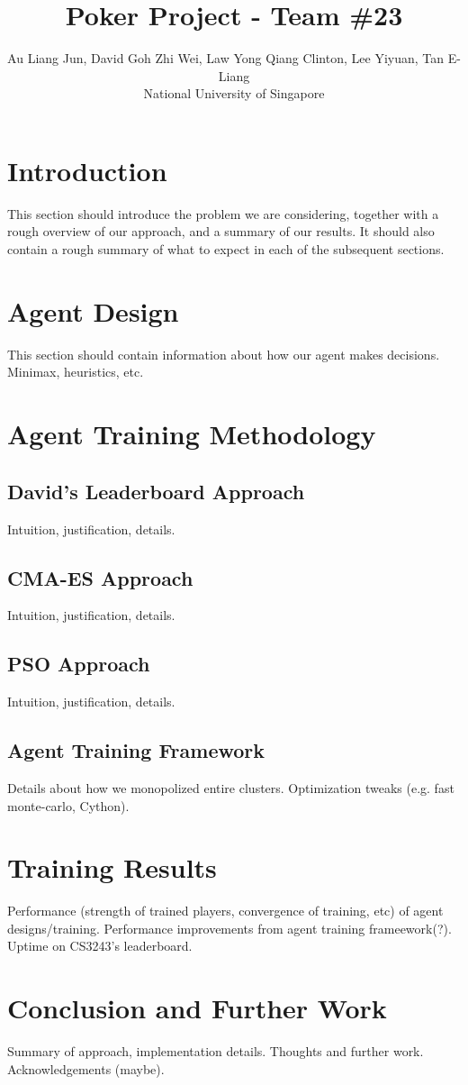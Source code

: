 \documentclass{article}
\title{Poker Project - Team \#23}
\author{
Au Liang Jun, David Goh Zhi Wei, Law Yong Qiang Clinton, Lee Yiyuan, Tan E-Liang
\\ 
National University of Singapore
}
\begin{document}
\maketitle

\section{Introduction}
This section should introduce the problem we are considering, together with a rough overview of our approach, and a summary of our results. It should also contain a rough summary of what to expect in each of the subsequent sections.

\section{Agent Design}
This section should contain information about how our agent makes decisions. Minimax, heuristics, etc.

\section{Agent Training Methodology}
\subsection{David's Leaderboard Approach}
Intuition, justification, details.

\subsection{CMA-ES Approach}
Intuition, justification, details.

\subsection{PSO Approach} 
Intuition, justification, details.

\subsection{Agent Training Framework}
Details about how we monopolized entire clusters. Optimization tweaks (e.g. fast monte-carlo, Cython).

\section{Training Results}
Performance (strength of trained players, convergence of training, etc) of agent designs/training. Performance improvements from agent training frameework(?). Uptime on CS3243's leaderboard.

\section{Conclusion and Further Work}
Summary of approach, implementation details. Thoughts and further work. Acknowledgements (maybe).



\end{document}
